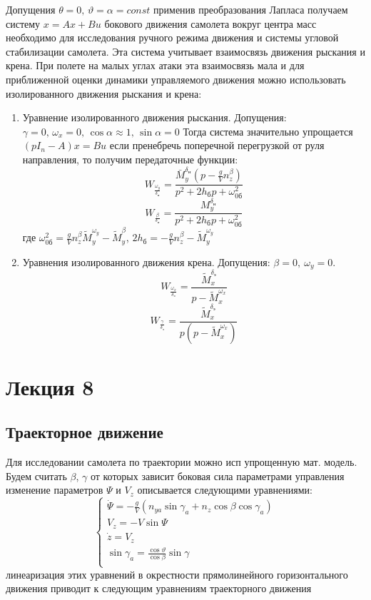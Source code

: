 \documentclass{article}
\begin{document}
Допущения $\theta = 0, \, \vartheta = \alpha = const$ применив преобразования
Лапласа получаем
систему $x = Ax + Bu$ бокового движения самолета вокруг центра масс необходимо
для исследования ручного режима движения и системы угловой стабилизации
самолета. Эта система учитывает взаимосвязь движения рыскания и крена. При
полете на малых углах атаки эта взаимосвязь мала и для приближенной оценки
динамики управляемого движения можно использовать изолированного движения
рыскания и крена:
\begin{enumerate}
	\item Уравнение изолированного движения рыскания. Допущения: $\gamma = 0,
		      \, \omega_x = 0, \, \cos{\alpha} \approx 1,\,\sin{\alpha} = 0$
	      Тогда система значительно упрощается
	      $(pI_n - A)x = B u$
	      если пренебречь поперечной перегрузкой от руля направления, то
	      получим передаточные функции:
	      \[
		      W_{\frac{\omega_y}{\delta_\text{н}}}=
		      \frac{\bar{M}_y^{\delta_\text{н}} (p - \frac{g}{V}
		      n_z^\beta)}{p^2 + 2 h_\text{б}p + \omega^2_{0\text{б}}}
	      \]
	      \[
		      W_{\frac{\beta}{\delta_\text{н}}} =
		      \frac{M_y^{\delta_\text{н}}}{p^2 + 2 h_\text{б}p +
		      \omega^2_{0\text{б}}}
	      \]
	      где $\omega_{0\text{б}}^2 = \frac{g}{V} n_z^\beta
		      \tilde{M}_y^{\omega_y} - \tilde{M}_y^\beta$, $2h_\text{б} =
		      -\frac{g}{V} n_z^\beta - \tilde{M}_y^{\omega_y}$
	\item Уравнения изолированного движения крена. Допущения: $\beta = 0,\
		      \omega_y = 0$.
	      \[
		      W_{\frac{\omega_x}{\delta_\text{э}}} =
		      \frac{\tilde{M}_x^{\delta_\text{э}}}{p - \tilde{M}_x^{\omega_x}}
	      \]
	      \[
		      W_{\frac{\gamma}{\delta_\text{э}}} =
		      \frac{\tilde{M}_x^{\delta_\text{э}}}{p(p -
		      \tilde{M}_x^{\omega_x})}
	      \]
\end{enumerate}
\newpage

\section{Лекция 8}
\subsection{Траекторное движение}
Для исследовании самолета по траектории можно исп упрощенную мат. модель. Будем
считать $\beta$, $\gamma$ от которых зависит боковая сила параметрами
управления изменение параметров $\Psi$ и $V_z$ описывается следующими
уравнениями:
\begin{equation}
	\begin{cases}
		\dot{\Psi} = -\frac{g}{V}(n_{ya} \sin{\gamma_a} + n_z \cos{\beta}
		\cos{\gamma_a}) \\
		V_z = -V\sin{\Psi}
		\\
		\dot{z} = V_z
		\\

		\sin{\gamma_a} = \frac{\cos{\vartheta}}{\cos{\beta}} \sin{\gamma}
		\\
	\end{cases}
\end{equation}
линеаризация этих уравнений в окрестности прямолинейного горизонтального
движения приводит к следующим уравнениям траекторного движения
\end{document}
